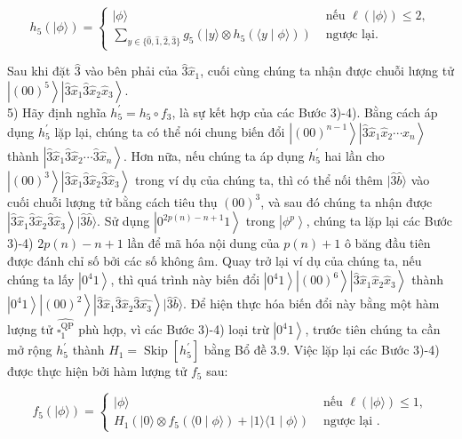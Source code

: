 \documentclass[10pt]{article}
\begin{document}
$$
h_{5}(|\phi\rangle)= \begin{cases}|\phi\rangle & \text { nếu } \ell(|\phi\rangle) \leq 2, \\ \sum_{y \in\{\hat{0}, \hat{1}, \hat{2}, \hat{3}\}} g_{5}\left(|y\rangle \otimes h_{5}(\langle y \mid \phi\rangle)\right) & \text { ngược lại. }\end{cases}
$$

Sau khi đặt $\hat{3}$ vào bên phải của $\hat{3} \hat{x}_{1}$, cuối cùng chúng ta nhận được chuỗi lượng tử $\left|(00)^{5}\right\rangle\left|\hat{3} \hat{x}_{1} \hat{3} \hat{x}_{2} \hat{x}_{3}\right\rangle$.\\
5) Hãy định nghĩa $h_{5}^{\prime}=h_{5} \circ f_{3}$, là sự kết hợp của các Bước 3)-4). Bằng cách áp dụng $h_{5}^{\prime}$ lặp lại, chúng ta có thể nói chung biến đổi $\left|(00)^{n-1}\right\rangle\left|\hat{3} \hat{x}_{1} \hat{x}_{2} \cdots \hat{x}_{n}\right\rangle$ thành $\left|\hat{3} \hat{x}_{1} \hat{3} \hat{x}_{2} \cdots \hat{3} \hat{x}_{n}\right\rangle$. Hơn nữa, nếu chúng ta áp dụng $h_{5}^{\prime}$ hai lần cho $\left|(00)^{3}\right\rangle\left|\hat{3} \hat{x}_{1} \hat{3} \hat{x}_{2} \hat{3} \hat{x}_{3}\right\rangle$ trong ví dụ của chúng ta, thì có thể nối thêm $|\hat{3} \hat{b}\rangle$ vào cuối chuỗi lượng tử bằng cách tiêu thụ $(00)^{3}$, và sau đó chúng ta nhận được $\left|\hat{3} \hat{x}_{1} \hat{3} \hat{x}_{2} \hat{3} \hat{x}_{3}\right\rangle|\hat{3} \hat{b}\rangle$. Sử dụng $\left|0^{2 p(n)-n+1} 1\right\rangle$ trong $\left|\phi^{p}\right\rangle$, chúng ta lặp lại các Bước 3)-4) $2 p(n)-n+1$ lần để mã hóa nội dung của $p(n)+1$ ô băng đầu tiên được đánh chỉ số bởi các số không âm. Quay trở lại ví dụ của chúng ta, nếu chúng ta lấy $\left|0^{4} 1\right\rangle$, thì quá trình này biến đổi $\left|0^{4} 1\right\rangle\left|(00)^{6}\right\rangle\left|\hat{3} \hat{x}_{1} \hat{x}_{2} \hat{x}_{3}\right\rangle$ thành $\left|0^{4} 1\right\rangle\left|(00)^{2}\right\rangle\left|\hat{3} \hat{x}_{1} \hat{3} \hat{x}_{2} \hat{3} \hat{x_{3}}\right\rangle|\hat{3} \hat{b}\rangle$. Để hiện thực hóa biến đổi này bằng một hàm lượng tử $\widehat{\square_{1}^{\mathrm{QP}}}$ phù hợp, vì các Bước 3)-4) loại trừ $\left|0^{4} 1\right\rangle$, trước tiên chúng ta cần mở rộng $h_{5}^{\prime}$ thành $H_{1}=\operatorname{Skip}\left[h_{5}^{\prime}\right]$ bằng Bổ đề 3.9. Việc lặp lại các Bước 3)-4) được thực hiện bởi hàm lượng tử $f_{5}$ sau:

$$
f_{5}(|\phi\rangle)= \begin{cases}|\phi\rangle & \text { nếu } \ell(|\phi\rangle) \leq 1, \\ H_{1}\left(|0\rangle \otimes f_{5}(\langle 0 \mid \phi\rangle)+|1\rangle\langle 1 \mid \phi\rangle\right) & \text { ngược lại } .\end{cases}
$$
\end{document}
